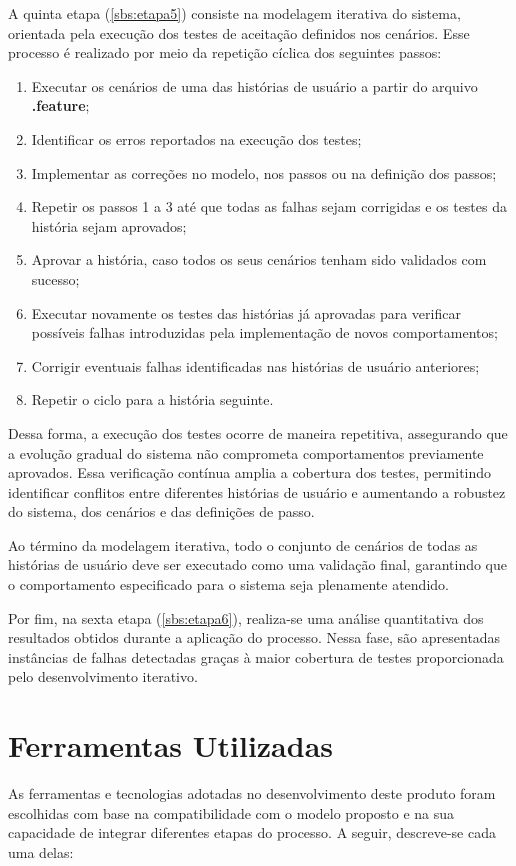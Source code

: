 A quinta etapa (\ref{sbs:etapa5}) consiste na modelagem iterativa do sistema, orientada pela execução dos testes de aceitação definidos nos cenários. Esse processo 
é realizado por meio da repetição cíclica dos seguintes passos:

\begin{enumerate}
    \item Executar os cenários de uma das histórias de usuário a partir do arquivo \textbf{.feature};
    \item Identificar os erros reportados na execução dos testes;
    \item Implementar as correções no modelo, nos passos ou na definição dos passos;
    \item Repetir os passos 1 a 3 até que todas as falhas sejam corrigidas e os testes da história sejam aprovados;
    \item Aprovar a história, caso todos os seus cenários tenham sido validados com sucesso;
    \item Executar novamente os testes das histórias já aprovadas para verificar possíveis falhas introduzidas pela implementação de novos comportamentos;
    \item Corrigir eventuais falhas identificadas nas histórias de usuário anteriores;
    \item Repetir o ciclo para a história seguinte.
\end{enumerate}

Dessa forma, a execução dos testes ocorre de maneira repetitiva, assegurando que a evolução gradual do sistema não comprometa comportamentos previamente aprovados. 
Essa verificação contínua amplia a cobertura dos testes, permitindo identificar conflitos entre diferentes histórias de usuário e aumentando a robustez do sistema, 
dos cenários e das definições de passo.

Ao término da modelagem iterativa, todo o conjunto de cenários de todas as histórias de usuário deve ser executado como uma validação final, garantindo que o 
comportamento especificado para o sistema seja plenamente atendido.

Por fim, na sexta etapa (\ref{sbs:etapa6}), realiza-se uma análise quantitativa dos resultados obtidos durante a aplicação do processo. Nessa fase, são apresentadas 
instâncias de falhas detectadas graças à maior cobertura de testes proporcionada pelo desenvolvimento iterativo.

\section{\textbf{Ferramentas Utilizadas}}
As ferramentas e tecnologias adotadas no desenvolvimento deste produto foram escolhidas com base na compatibilidade com o modelo proposto e na sua capacidade 
de integrar diferentes etapas do processo. A seguir, descreve-se cada uma delas:

